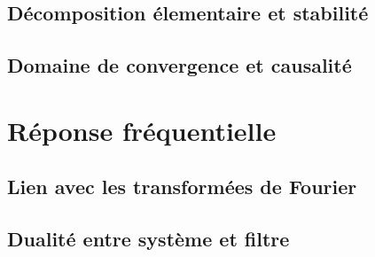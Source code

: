 \subsection{Décomposition élementaire et stabilité}
\subsection{Domaine de convergence et causalité}

\section{Réponse fréquentielle}
\subsection{Lien avec les transformées de Fourier}
\subsection{Dualité entre système et filtre}





